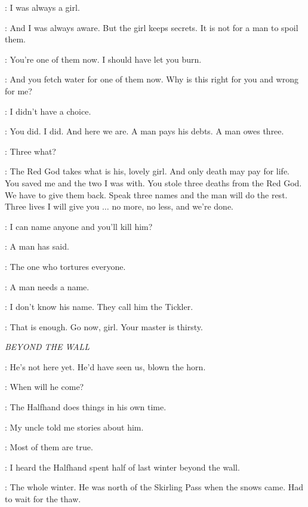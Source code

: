 \ARYA: I was always a girl. 

\JAQEN: And I was always aware. But the girl keeps secrets. It is not for a man to spoil them. 

\ARYA: You're one of them now. I should have let you burn. 

\JAQEN: And you fetch water for one of them now. Why is this right for you and wrong for me? 

\ARYA: I didn't have a choice. 

\JAQEN: You did. I did. And here we are. A man pays his debts. A man owes three. 

\ARYA: Three what? 

\JAQEN: The Red God takes what is his, lovely girl. And only death may pay for life. You saved me and the two I was with. You stole three deaths from the Red God. We have to give them back. Speak three names and the man will do the rest. Three lives I will give you $\ldots$ no more, no less, and we're done. 

\ARYA: I can name anyone and you'll kill him? 

\JAQEN: A man has said. 

\ARYA: The one who tortures everyone. 

\JAQEN: A man needs a name. 

\ARYA: I don't know his name. They call him the Tickler. 

\JAQEN: That is enough. Go now, girl. Your master is thirsty. 



\scene

\textit{BEYOND THE WALL} 


\JEOR: He's not here yet. He'd have seen us, blown the horn. 

\JON: When will he come? 

\JEOR: The Halfhand does things in his own time. 

\JON: My uncle told me stories about him. 

\JEOR: Most of them are true. 

\JON: I heard the Halfhand spent half of last winter beyond the wall. 

\JEOR: The whole winter. He was north of the Skirling Pass when the snows came. Had to wait for the thaw. 

